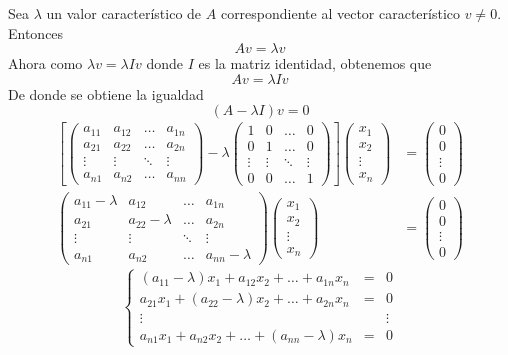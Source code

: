 \noindent Sea $\lambda$ un valor característico de $A$ correspondiente al vector característico $v \neq 0$. Entonces 
$$Av = \lambda v$$
Ahora como $\lambda v = \lambda I v$ donde $I$ es la matriz identidad, obtenemos que 
$$Av = \lambda I v$$
De donde se obtiene la igualdad 
$$(A - \lambda I) v = 0$$
\begin{align*}
\left[ \left( \begin{array}{cccc}
a_{11} & a_{12} & \ldots & a_{1n}\\
a_{21} & a_{22} & \ldots & a_{2n}\\
\vdots & \vdots & \ddots & \vdots\\
a_{n1} & a_{n2} & \ldots & a_{nn}
\end{array} \right) - \lambda \left( \begin{array}{cccc}
1 & 0 & \ldots & 0\\
0 & 1 & \ldots & 0\\
\vdots & \vdots & \ddots & \vdots\\
0 & 0 & \ldots & 1
\end{array} \right) \right] \left( \begin{array}{c}
x_1\\
x_2\\
\vdots\\
x_n
\end{array} \right) &= \left( \begin{array}{c}
0\\
0\\
\vdots\\
0
\end{array} \right)\\
\left( \begin{array}{cccc}
a_{11} - \lambda & a_{12} & \ldots & a_{1n}\\
a_{21} & a_{22} - \lambda & \ldots & a_{2n}\\
\vdots & \vdots & \ddots & \vdots\\
a_{n1} & a_{n2} & \ldots & a_{nn} - \lambda
\end{array} \right) \left( \begin{array}{c}
x_1\\
x_2\\
\vdots\\
x_n
\end{array} \right) &= \left( \begin{array}{c}
0\\
0\\
\vdots\\
0
\end{array} \right)
\end{align*}
$$\left\{ \begin{array}{ccl}
(a_{11}- \lambda)x_1 + a_{12} x_2 + \ldots + a_{1n} x_n & = & 0\\
a_{21}x_1 + (a_{22} - \lambda)x_2 + \ldots + a_{2n} x_n & = & 0\\
\vdots && \vdots\\
a_{n1} x_1 + a_{n2} x_2 + \ldots + (a_{nn} - \lambda) x_n & = & 0
\end{array}\right.$$

